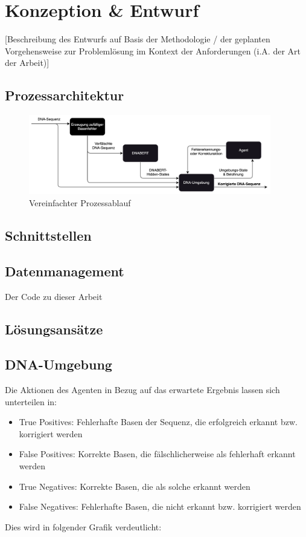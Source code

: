 \documentclass[oneside,bibliography=totocnumbered,BCOR=5mm]{scrbook}%
\theoremstyle{definition}
\theoremstyle{definition}
\theoremstyle{definition}
\theoremstyle{definition}
\theoremstyle{definition}
\theoremstyle{definition}
\begin{document}
\clearpage

\chapter{Konzeption \& Entwurf}
[Beschreibung des Entwurfs auf Basis der Methodologie / der geplanten Vorgehensweise zur Problemlösung im Kontext der Anforderungen (i.A. der Art der Arbeit)]
\section{Prozessarchitektur}

\begin{figure}
  \centering
  \includegraphics[width=400px,keepaspectratio]{images/Process_simplified.png}
  \caption{Vereinfachter Prozessablauf}
  \label{process_simplified}
  \end{figure}

\section{Schnittstellen}
\section{Datenmanagement}
Der Code zu dieser Arbeit 
\section{Lösungsansätze}

\section{DNA-Umgebung}

Die Aktionen des Agenten in Bezug auf das erwartete Ergebnis lassen sich unterteilen in:


\begin{itemize}
  \item True Positives: Fehlerhafte Basen der Sequenz, die erfolgreich erkannt bzw. korrigiert werden
  \item False Positives: Korrekte Basen, die fälschlicherweise als fehlerhaft erkannt werden
  \item True Negatives: Korrekte Basen, die als solche erkannt werden
  \item False Negatives: Fehlerhafte Basen, die nicht erkannt bzw. korrigiert werden
\end{itemize}
Dies wird in folgender Grafik verdeutlicht:
\end{document}
